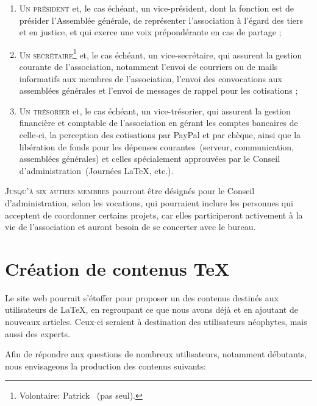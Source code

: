 \documentclass{tufte-handout}
\begin{document}
\begin{enumerate}
\item\textsc{Un président} et, le cas échéant, un vice-président, dont la
  fonction est de présider l'Assemblée générale, de représenter l'association
  à l'égard des tiers et en justice, et qui exerce une voix prépondérante en cas
  de partage ;
\item\textsc{Un secrétaire}\footnote{Volontaire: Patrick ~(pas
    seul).} et, le cas échéant, un vice-secrétaire, qui assurent la gestion
  courante de l'association, notamment l'envoi de courriers ou de mails
  informatifs aux membres de l'association, l'envoi des convocations aux
  assemblées générales et l'envoi de messages de rappel pour les cotisations ;
\item\textsc{Un trésorier} et, le cas échéant, un vice-trésorier, qui assurent
  la gestion financière et comptable de l'association en gérant les comptes
  bancaires de celle-ci, la perception des cotisations par PayPal et par chèque,
  ainsi que la libération de fonds pour les dépenses courantes~(serveur,
  communication, assemblées générales) et celles spécialement approuvées par le
  Conseil d'administration~(Journées \LaTeX, etc.).
\end{enumerate}

\textsc{Jusqu'à six autres membres} pourront être désignés pour le Conseil
d'administration, selon les vocations, qui pourraient inclure les personnes qui
acceptent de coordonner certains projets, car elles participeront activement
à la vie de l'association et auront besoin de se concerter avec le bureau.

\section{Création de contenus \TeX}

Le site web pourrait s'étoffer pour proposer un des contenus destinés aux
utilisateurs de \LaTeX, en regroupant ce que nous avons déjà et en ajoutant de
nouveaux articles. Ceux-ci seraient à destination des utilisateurs néophytes,
mais aussi des experts.

Afin de répondre aux questions de nombreux utilisateurs, notamment débutants,
nous envisageons la production des contenus suivants:
\end{document}
